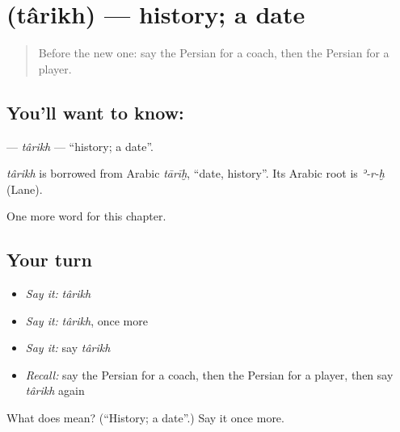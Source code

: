 \section[\texorpdfstring{\fa{تاریخ} (târikh)}{تاریخ (târikh)}]{ (târikh) — history; a date}

\label{lesson:FA-C251-tarikh}



\begin{quote}
Before the new one: say the Persian for a coach, then the Persian for a player.
\end{quote}

\subsection*{You'll want to know: }
\textbf{} — \emph{târikh} — \textquotedblleft{}history; a date\textquotedblright{}.

\begin{cousinweb}
\emph{târikh} is borrowed from Arabic \emph{tārīḫ}, \textquotedblleft{}date, history\textquotedblright{}. Its Arabic root is \emph{ʾ-r-ḫ} (Lane).
\end{cousinweb}

\begin{grammarlens}[title={What you've built}]
One more word for this chapter.
\end{grammarlens}

\subsection*{Your turn}
\begin{itemize}
\raggedright
  \item \emph{Say it:} \emph{târikh}
  \item \emph{Say it:} \emph{târikh}, once more
  \item \emph{Say it:} say \emph{târikh}
  \item \emph{Recall:} say the Persian for a coach, then the Persian for a player, then say \emph{târikh} again
\end{itemize}

\begin{tcolorbox}[breakable,colback=teal!4,colframe=teal!35!black,title={Before you move on}]
What does  mean? (\textquotedblleft{}History; a date\textquotedblright{}.) Say it once more.
\end{tcolorbox}
